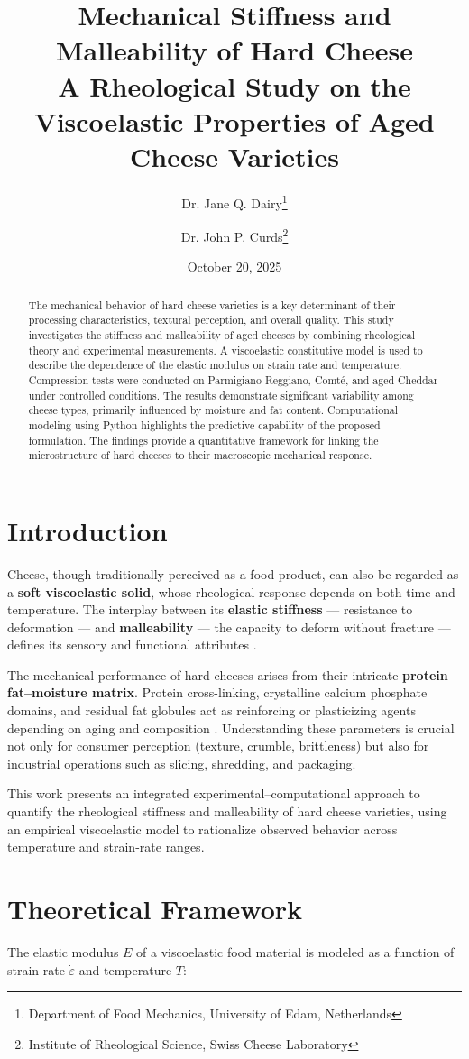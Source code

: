 \documentclass[a4paper,twoside]{article}
\title{Mechanical Stiffness and Malleability of Hard Cheese\\[0.5em]\large A Rheological Study on the Viscoelastic Properties of Aged Cheese Varieties}
\author{Dr. Jane Q. Dairy\thanks{Department of Food Mechanics, University of Edam, Netherlands} \and Dr. John P. Curds\thanks{Institute of Rheological Science, Swiss Cheese Laboratory}}\date{October 20, 2025}
\begin{document}
\maketitle
\begin{abstract}
The mechanical behavior of hard cheese varieties is a key determinant of their
processing characteristics, textural perception, and overall quality. This study
investigates the stiffness and malleability of aged cheeses by combining
rheological theory and experimental measurements. A viscoelastic constitutive
model is used to describe the dependence of the elastic modulus on strain rate
and temperature. Compression tests were conducted on Parmigiano-Reggiano, Comté,
and aged Cheddar under controlled conditions. The results demonstrate significant
variability among cheese types, primarily influenced by moisture and fat content.
Computational modeling using Python highlights the predictive capability of the
proposed formulation. The findings provide a quantitative framework for linking
the microstructure of hard cheeses to their macroscopic mechanical response.
\end{abstract}
\section{Introduction}
Cheese, though traditionally perceived as a food product, can also be regarded
as a \textbf{soft viscoelastic solid}, whose rheological response depends on both time
and temperature. The interplay between its \textbf{elastic stiffness} --- resistance
to deformation --- and \textbf{malleability} --- the capacity to deform without
fracture --- defines its sensory and functional attributes \cite{Prentice1993}.

The mechanical performance of hard cheeses arises from their intricate
\textbf{protein--fat--moisture matrix}. Protein cross-linking, crystalline calcium
phosphate domains, and residual fat globules act as reinforcing or plasticizing
agents depending on aging and composition \cite{Jaoac2019}. Understanding these
parameters is crucial not only for consumer perception (texture, crumble,
brittleness) but also for industrial operations such as slicing, shredding,
and packaging.

This work presents an integrated experimental--computational approach to quantify
the rheological stiffness and malleability of hard cheese varieties, using an
empirical viscoelastic model to rationalize observed behavior across temperature
and strain-rate ranges.
\section{Theoretical Framework}
The elastic modulus $E$ of a viscoelastic food material is modeled as a function
of strain rate $\dot{\varepsilon}$ and temperature $T$:
\end{document}
